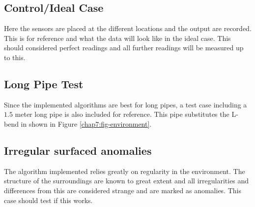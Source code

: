\subsection{Control/Ideal Case}
Here the sensors are placed at the different locations and the output are recorded. This
is for reference and what the data will look like in the ideal case. This should
considered perfect readings and all further readings will be measured up to this.

\subsection{Long Pipe Test}
Since the implemented algorithms are best for long pipes, a test case including a
$1.5$ meter long pipe is also included for reference. This pipe substitutes the L-bend in
shown in Figure \ref{chap7:fig-environment}.


\subsection{Irregular surfaced anomalies}
The algorithm implemented relies greatly on regularity in the environment. The structure
of the surroundings are known to great extent and all irregularities and differences from
this are considered strange and are marked as anomalies. This case should test if this
works.


